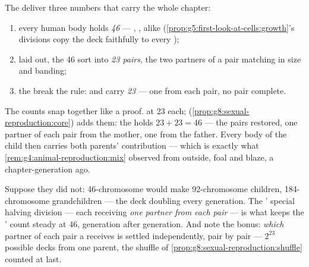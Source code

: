\begin{proposition}\label{prop:g9:chromosomes:counts}
The  deliver three numbers that carry the whole
chapter:
\begin{enumerate}
  \item every human body  holds \emph{46} 
        --- , ,  alike
        (\cref{prop:g5:first-look-at-cells:growth}'s
        divisions copy the deck faithfully to every );
  \item laid out, the 46 sort into \emph{23 pairs}, the
        two partners of a pair matching in size and
        banding;
  \item the \emph{} break the rule:  and
         carry \emph{23} --- one  from
        each pair, no pair complete.
\end{enumerate}
\end{proposition}
\admitted

\begin{example}\label{ex:g9:chromosomes:arithmetic}
The counts snap together like a proof.  at 23 each;
 (\cref{prop:g8:sexual-reproduction:core})
adds them: the  holds $23 + 23 = 46$ --- the pairs
restored, one partner of each pair from the mother, one
from the father. Every body  of the child then carries
both parents' contribution --- which is exactly what
\cref{rem:g4:animal-reproduction:mix} observed from
outside, foal and blaze, a chapter-generation ago.
\end{example}

\begin{remark}\label{rem:g9:chromosomes:whyhalve}
Suppose they did not: 46-chromosome  would make
92-chromosome children, 184-chromosome grandchildren ---
the deck doubling every generation. The ' special
halving division --- each receiving \emph{one partner from
each pair} --- is what keeps the ' count steady at
46, generation after generation. And note the bonus:
\emph{which} partner of each pair a  receives is
settled independently, pair by pair --- $2^{23}$ possible
decks from one parent, the shuffle of
\cref{prop:g8:sexual-reproduction:shuffle} counted at
last.
\end{remark}

